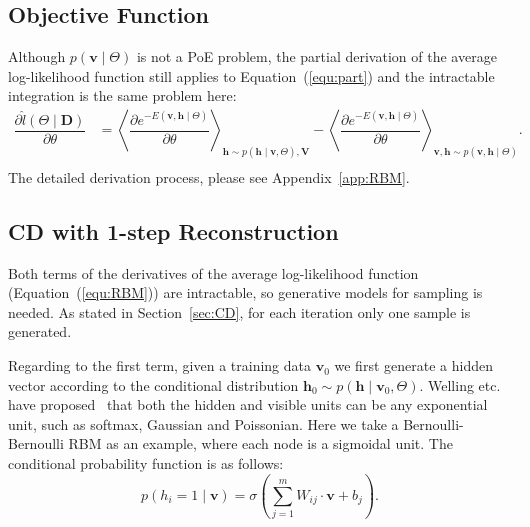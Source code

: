 \documentclass[11pt,twoside,a4paper]{article}
\begin{document}
\subsection{Objective Function}
	Although $ p(\mathbf{v} \mid \Theta) $ is not a PoE problem, the partial derivation of the average log-likelihood function still applies to Equation~(\ref{equ:part}) and the intractable integration is the same problem here:
	\begin{equation}
		\label{equ:RBM}
		\begin{aligned}
		\dfrac{\partial \hat{l} (\Theta \mid \mathbf{D})}{\partial \theta} 
		& = \left \langle \dfrac{\partial e^{-E(\mathbf{v}, \mathbf{h} \mid \Theta)}}{\partial \theta} \right \rangle_{\mathbf{h} \sim p( \mathbf{h} \mid \mathbf{v}, \Theta), \mathbf{V}} 
		- \left \langle \dfrac{\partial e^{-E(\mathbf{v}, \mathbf{h} \mid \Theta)}}{\partial \theta} \right \rangle_{\mathbf{v}, \mathbf{h} \sim p( \mathbf{v}, \mathbf{h} \mid  \Theta)}.  \\
		\end{aligned}
	\end{equation}
	The detailed derivation process, please see Appendix~\ref{app:RBM}.
\subsection{CD with 1-step Reconstruction}
	Both terms of the derivatives of the average log-likelihood function (Equation~(\ref{equ:RBM})) are intractable, so generative models for sampling is needed.
	As stated in Section~\ref{sec:CD}, for each iteration only one sample is generated.
	
	Regarding to the first term, given a training data $ \mathbf{v}_0 $ we first generate a hidden vector according to the conditional distribution $ \mathbf{h}_0 \sim p( \mathbf{h} \mid \mathbf{v}_0, \Theta) $.
	Welling etc. have proposed~\cite{welling2004exponential} that both the hidden and visible units can be any exponential unit, such as softmax, Gaussian and Poissonian.
	Here we take a Bernoulli-Bernoulli RBM as an example, where each node is a sigmoidal unit.
	The conditional probability function is as follows:
	\begin{equation}
		p(h_i = 1 \mid \mathbf{v}) = \sigma(\sum_{j=1}^{m} W_{ij} \cdot \mathbf{v} + b_j).
	\end{equation}
	
\end{document}
